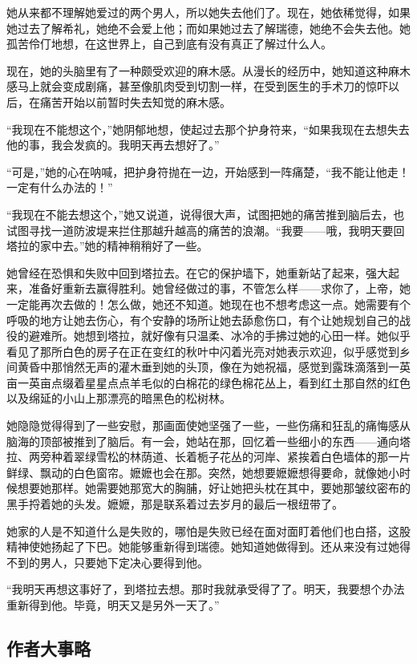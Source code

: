 \par 她从来都不理解她爱过的两个男人，所以她失去他们了。现在，她依稀觉得，如果她过去了解希礼，她绝不会爱上他；而如果她过去了解瑞德，她绝不会失去他。她孤苦伶仃地想，在这世界上，自己到底有没有真正了解过什么人。
\par 现在，她的头脑里有了一种颇受欢迎的麻木感。从漫长的经历中，她知道这种麻木感马上就会变成剧痛，甚至像肌肉受到切割一样，在受到医生的手术刀的惊吓以后，在痛苦开始以前暂时失去知觉的麻木感。
\par “我现在不能想这个，”她阴郁地想，使起过去那个护身符来，“如果我现在去想失去他的事，我会发疯的。我明天再去想好了。”
\par “可是，”她的心在呐喊，把护身符抛在一边，开始感到一阵痛楚，“我不能让他走！一定有什么办法的！”
\par “我现在不能去想这个，”她又说道，说得很大声，试图把她的痛苦推到脑后去，也试图寻找一道防波堤来拦住那越升越高的痛苦的浪潮。“我要——哦，我明天要回塔拉的家中去。”她的精神稍稍好了一些。
\par 她曾经在恐惧和失败中回到塔拉去。在它的保护墙下，她重新站了起来，强大起来，准备好重新去赢得胜利。她曾经做过的事，不管怎么样——求你了，上帝，她一定能再次去做的！怎么做，她还不知道。她现在也不想考虑这一点。她需要有个呼吸的地方让她去伤心，有个安静的场所让她去舔愈伤口，有个让她规划自己的战役的避难所。她想到塔拉，就好像有只温柔、冰冷的手拂过她的心田一样。她似乎看见了那所白色的房子在正在变红的秋叶中闪着光亮对她表示欢迎，似乎感觉到乡间黄昏中那悄然无声的灌木垂到她的头顶，像在为她祝福，感觉到露珠滴落到一英亩一英亩点缀着星星点点羊毛似的白棉花的绿色棉花丛上，看到红土那自然的红色以及绵延的小山上那漂亮的暗黑色的松树林。
\par 她隐隐觉得得到了一些安慰，那画面使她坚强了一些，一些伤痛和狂乱的痛悔感从脑海的顶部被推到了脑后。有一会，她站在那，回忆着一些细小的东西——通向塔拉、两旁种着翠绿雪松的林荫道、长着栀子花丛的河岸、紧挨着白色墙体的那一片鲜绿、飘动的白色窗帘。嬷嬷也会在那。突然，她想要嬷嬷想得要命，就像她小时候想要她那样。她需要她那宽大的胸脯，好让她把头枕在其中，要她那皱纹密布的黑手捋着她的头发。嬷嬷，那是联系着过去岁月的最后一根纽带了。
\par 她家的人是不知道什么是失败的，哪怕是失败已经在面对面盯着他们也白搭，这股精神使她扬起了下巴。她能够重新得到瑞德。她知道她做得到。还从来没有过她得不到的男人，只要她下定决心要得到他。
\par “我明天再想这事好了，到塔拉去想。那时我就承受得了了。明天，我要想个办法重新得到他。毕竟，明天又是另外一天了。”

\subsection{作者大事略}


